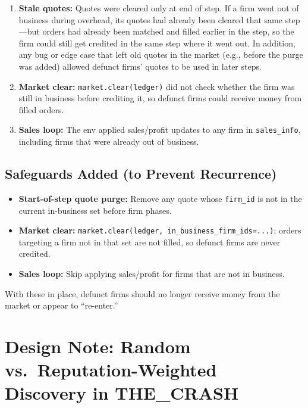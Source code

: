 \documentclass{article}
\begin{document}
\begin{enumerate}
    \item \textbf{Stale quotes:} Quotes were cleared only at end of step. If a firm went out of business during overhead, its quotes had already been cleared that same step---but orders had already been matched and filled earlier in the step, so the firm could still get credited in the same step where it went out. In addition, any bug or edge case that left old quotes in the market (e.g., before the purge was added) allowed defunct firms' quotes to be used in later steps.
    \item \textbf{Market clear:} \texttt{market.clear(ledger)} did not check whether the firm was still in business before crediting it, so defunct firms could receive money from filled orders.
    \item \textbf{Sales loop:} The env applied sales/profit updates to any firm in \texttt{sales\_info}, including firms that were already out of business.
\end{enumerate}

\subsection{Safeguards Added (to Prevent Recurrence)}

\begin{itemize}
    \item \textbf{Start-of-step quote purge:} Remove any quote whose \texttt{firm\_id} is not in the current in-business set before firm phases.
    \item \textbf{Market clear:} \texttt{market.clear(ledger, in\_business\_firm\_ids=...)}; orders targeting a firm not in that set are not filled, so defunct firms are never credited.
    \item \textbf{Sales loop:} Skip applying sales/profit for firms that are not in business.
\end{itemize}

With these in place, defunct firms should no longer receive money from the market or appear to ``re-enter.''

\section{Design Note: Random vs.\ Reputation-Weighted Discovery in THE\_CRASH}
\end{document}
